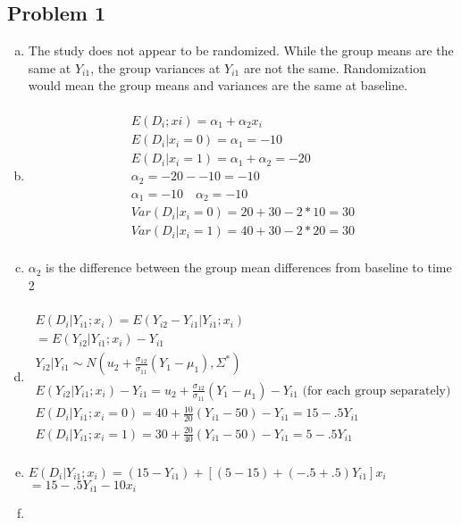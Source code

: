 \documentclass{article}
\newcommand{\sg}{\sigma}
\begin{document}
\begin{flushleft}

\section*{Problem 1}
\begin{enumerate}[(a)]
\item
The study does not appear to be randomized. While the group means are the same at $Y_{i1}$, the group variances at $Y_{i1}$ are not the same. Randomization would mean the group means and variances are the same at baseline.
\item
\begin{multline*}\\
E(D_i;xi)=\alpha_1+\alpha_2 x_i\\
E(D_i|x_i=0)=\alpha_1=-10\\
E(D_i|x_i=1)=\alpha_1+\alpha_2=-20\\
\alpha_2=-20--10=-10\\
\alpha_1=-10 \quad \alpha_2=-10\\
Var(D_i|x_i=0)=20+30-2*10=30\\
Var(D_i|x_i=1)=40+30-2*20=30\\
\end{multline*}
\item
$\alpha_2$ is the difference between the group mean differences from baseline to time 2
\item
\begin{multline*}\\
E(D_i|Y_{i1};x_i)=E(Y_{i2}-Y_{i1}|Y_{i1};x_i)\\
=E(Y_{i2}|Y_{i1};x_i)-Y_{i1}\\
Y_{i2}|Y_{i1}\sim N(u_2+\frac{\sg_{12}}{\sg_{11}}(Y_1-\mu_1),\Sigma^*)\\
E(Y_{i2}|Y_{i1};x_i)-Y_{i1}=u_2+\frac{\sg_{12}}{\sg_{11}}(Y_1-\mu_1)-Y_{i1} \text{ (for each group separately)}\\
E(D_i|Y_{i1};x_i=0)=40+\frac{10}{20}(Y_{i1}-50)-Y_{i1}=15-.5Y_{i1}\\
E(D_i|Y_{i1};x_i=1)=30+\frac{20}{40}(Y_{i1}-50)-Y_{i1}=5-.5Y_{i1}\\
\end{multline*}
\item
$E(D_i|Y_{i1};x_i)=(15-Y_{i1})+[(5-15)+(-.5+.5)Y_{i1}]x_i$\\
$=15-.5Y_{i1}-10x_i$
\pagebreak
\item
\begin{multline*}\\

\end{multline*}
\end{enumerate}
\end{flushleft}
\end{document}
